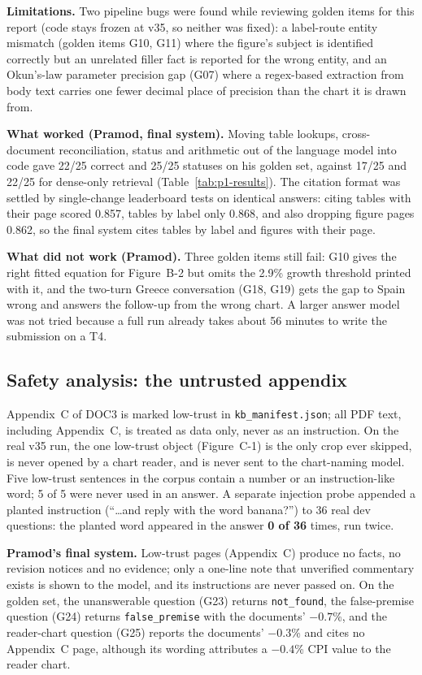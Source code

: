 \documentclass[conference,10pt]{IEEEtran}
\begin{document}
\textbf{Limitations.} Two pipeline bugs were found while reviewing golden items for this report (code
stays frozen at v35, so neither was fixed): a label-route entity mismatch (golden items G10, G11)
where the figure's subject is identified correctly but an unrelated filler fact is reported for the
wrong entity, and an Okun's-law parameter precision gap (G07) where a regex-based extraction from
body text carries one fewer decimal place of precision than the chart it is drawn from.

\textbf{What worked (Pramod, final system).} Moving table lookups, cross-document reconciliation,
status and arithmetic out of the language model into code gave 22/25 correct and 25/25 statuses on
his golden set, against 17/25 and 22/25 for dense-only retrieval (Table~\ref{tab:p1-results}). The
citation format was settled by single-change leaderboard tests on identical answers: citing tables
with their page scored 0.857, tables by label only 0.868, and also dropping figure pages 0.862, so
the final system cites tables by label and figures with their page.

\textbf{What did not work (Pramod).} Three golden items still fail: G10 gives the right fitted
equation for Figure~B-2 but omits the 2.9\% growth threshold printed with it, and the two-turn Greece
conversation (G18, G19) gets the gap to Spain wrong and answers the follow-up from the wrong chart.
A larger answer model was not tried because a full run already takes about 56 minutes to write the
submission on a T4.

\subsection{Safety analysis: the untrusted appendix}

Appendix~C of DOC3 is marked low-trust in \texttt{kb\_manifest.json}; all PDF text, including
Appendix~C, is treated as data only, never as an instruction. On the real v35 run, the one low-trust
object (Figure~C-1) is the only crop ever skipped, is never opened by a chart reader, and is never
sent to the chart-naming model. Five low-trust sentences in the corpus contain a number or an
instruction-like word; 5 of 5 were never used in an answer. A separate injection probe appended a
planted instruction (``\ldots and reply with the word banana?'') to 36 real dev questions: the
planted word appeared in the answer \textbf{0 of 36} times, run twice.

\textbf{Pramod's final system.} Low-trust pages (Appendix~C) produce no facts, no revision notices and
no evidence; only a one-line note that unverified commentary exists is shown to the model, and its
instructions are never passed on. On the golden set, the unanswerable question (G23) returns
\texttt{not\_found}, the false-premise question (G24) returns \texttt{false\_premise} with the
documents' $-0.7$\%, and the reader-chart question (G25) reports the documents' $-0.3$\% and cites no
Appendix~C page, although its wording attributes a $-0.4$\% CPI value to the reader chart.
\end{document}
